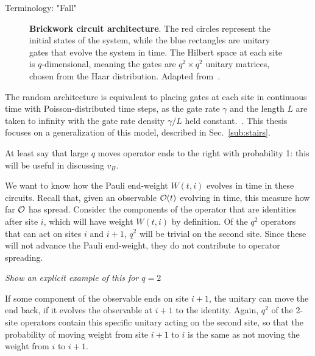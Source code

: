 Terminology: "Fall"

\begin{figure}
	\centering
	
	\caption{\textbf{Brickwork circuit architecture}. The red circles represent the initial states of the system, while the blue rectangles are unitary gates that evolve the system in time. The Hilbert space at each site is $q$-dimensional, meaning the gates are $q^2\times q^2$ unitary  matrices, chosen from the Haar distribution. Adapted from~\cite{Keyserlingk}.}
	\label{fig:brickcircuit}
\end{figure}

The random architecture is equivalent to placing gates at each site in continuous time with Poisson-distributed time steps, as the gate rate $\gamma$ and the length $L$ are taken to infinity with the gate rate density $\gamma/L$ held constant.~\cite{Nahum2017}. This thesis focuses on a generalization of this model, described in Sec.~\ref{sub:stairs}.

At least say that large $q$ moves operator ends to the right with probability 1: this will be useful in discussing $v_B$.

We want to know how the Pauli end-weight $W(t,i)$ evolves in time in these circuits. Recall that, given an observable $\cal{O}(t)$ evolving in time, this measure how far $\cal{O}$ has spread. Consider the components of the operator that are identities after site $i$, which will have weight $W(t, i)$ by definition. Of the $q^2$ operators that can act on sites $i$ and $i+1$, $q^2$ will be trivial on the second site. Since these will not advance the Pauli end-weight, they do not contribute to operator spreading. 

\emph{Show an explicit example of this for $q=2$}

If some component of the observable ends on site $i+1$, the unitary can move the end back, if it evolves the observable at $i+1$ to the identity. Again, $q^2$ of the 2-site operators contain this specific unitary acting on the second site, so that the probability of moving weight from site $i+1$ to $i$ is the same as not moving the weight from $i$ to $i+1$.


